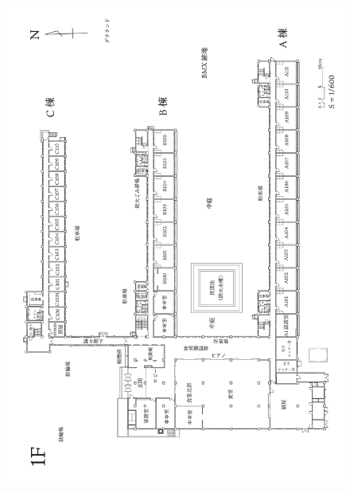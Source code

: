 \newpage
\begin{figure}[bh]
\centering
\includegraphics[]{gazo/熊野寮建物図面_ver.2_page-0002.jpg}
\end{figure}


